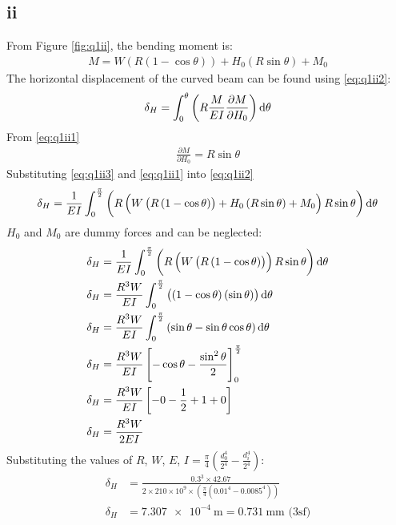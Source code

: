 \documentclass[11pt]{article}
\numberwithin{equation}{section}
\begin{document}
\subsection{ii}
From Figure \ref{fig:q1ii}, the bending moment is:
\begin{align}
    M = W\left(R\left(1-\cos\theta\right)\right)+ H_0 \left(R\sin\theta\right) + M_0 \label{eq:q1ii1}
\end{align}
The horizontal displacement of the curved beam can be found using \ref{eq:q1ii2}:
\begin{equation}
    \delta_H = \int_0^{\theta} \left(R\frac{M}{EI}\frac{\partial M}{\partial H_0}\right)\dif \theta \label{eq:q1ii2}
\end{equation}
From \ref{eq:q1ii1}
\begin{align}
    \frac{\partial M}{\partial H_0} = R\sin\theta \label{eq:q1ii3}
\end{align}
Substituting \ref{eq:q1ii3} and \ref{eq:q1ii1} into \ref{eq:q1ii2}
\begin{align}
    \delta_H = \frac{1}{EI}\int_0^{\frac{\pi}{2}} \left(R\left(W\left(R\left(1-\cos\theta\right)\right) + H_0\left(R\sin\theta\right) + M_0\right)R\sin\theta\right)\dif \theta
\end{align}
$H_0$ and $M_0$ are dummy forces and can be neglected:
\begin{align}
    \delta_H &= \frac{1}{EI}\int_0^{\frac{\pi}{2}} \left(R\left(W\left(R\left(1-\cos\theta\right)\right)\right)R\sin\theta\right)\dif \theta\\
    \delta_H &= \frac{R^3W}{EI}\int_0^{\frac{\pi}{2}} \left(\left(1-\cos\theta\right)\left(\sin\theta\right)\right)\dif \theta\\
    \delta_H &= \frac{R^3W}{EI}\int_0^{\frac{\pi}{2}} \left(\sin\theta - \sin\theta\cos\theta\right)\dif \theta\\
    \delta_H &= \frac{R^3W}{EI}\left[-\cos\theta - \frac{\sin^2\theta}{2}\right]_0^{\frac{\pi}{2}}\\
    \delta_H &= \frac{R^3W}{EI}\left[-0 -\frac{1}{2}+1 + 0\right]\\
    \delta_H &= \frac{R^3W}{2EI}
\end{align}
Substituting the values of $R$, $W$, $E$, $I = \frac{\pi}{4}\left(\frac{d_0^4}{2^4}-\frac{d_i^4}{2^4}\right)$:
\begin{align}
    \delta_H &= \frac{0.3^3\times 42.67}{2\times 210\times 10^{9} \times \left(\frac{\pi}{4}\left(0.01^4 - 0.0085^4\right)\right)}\\
    \delta_H &= \SI{7.307e-4}{\meter} = \SI{0.731}{\milli \meter}\textrm{ (3sf)}
\end{align}
\end{document}
